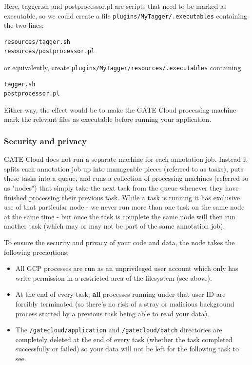 Here, tagger.sh and postprocessor.pl are scripts that need to be marked as
executable, so we could create a file \verb^plugins/MyTagger/.executables^
containing the two lines:

\begin{small}
\begin{verbatim}
resources/tagger.sh
resources/postprocessor.pl
\end{verbatim}
\end{small}

or equivalently, create \verb^plugins/MyTagger/resources/.executables^ containing

\begin{small}
\begin{verbatim}
tagger.sh
postprocessor.pl
\end{verbatim}
\end{small}

Either way, the effect would be to make the GATE Cloud processing machine
mark the relevant files as executable before running your application.

\subsubsection{Security and privacy}

GATE Cloud does not run a separate machine for each annotation job.  Instead
it splits each annotation job up into manageable pieces (referred to as tasks),
puts these tasks into a queue, and runs a collection of processing machines
(referred to as "nodes") that simply take the next task from the queue whenever
they have finished processing their previous task.  While a task is running it
has exclusive use of that particular node - we never run more than one task on
the same node at the same time - but once the task is complete the same node
will then run another task (which may or may not be part of the same annotation
job).

To ensure the security and privacy of your code and data, the node takes the
following precautions:

\begin{itemize}
\item All GCP processes are run as an unprivileged user account which only has
  write permission in a restricted area of the filesystem (see above).
\item At the end of every task, {\bf all} processes running under that user ID are
  forcibly terminated (so there's no risk of a stray or malicious background
  process started by a previous task being able to read your data).
\item The \verb^/gatecloud/application^ and \verb^/gatecloud/batch^ directories are
  completely deleted at the end of every task (whether the task completed
  successfully or failed) so your data will not be left for the following task
  to see.
\end{itemize}

